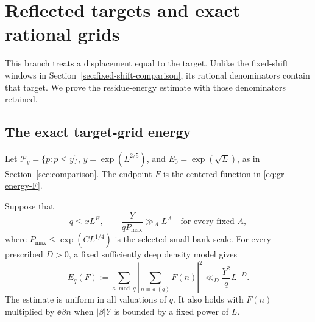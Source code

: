 \section{Reflected targets and exact rational grids}\label{sec:reflected-comparison}

This branch treats a displacement equal to the target. Unlike the
fixed-shift windows in Section~\ref{sec:fixed-shift-comparison}, its
rational denominators contain that target. We prove the residue-energy
estimate with those denominators retained.

\subsection{The exact target-grid energy}


Let \(\mathcal P_y=\{p:p\le y\}\), \(y=\exp(L^{2/5})\), and
\(E_0=\exp(\sqrt L)\), as in Section~\ref{sec:comparison}.
The endpoint \(F\) is the centered function in \eqref{eq:gr-energy-F}.

\begin{proposition}\label{prop:gr-energy}
Suppose that
\begin{equation}
       q\le xL^B,\qquad
       \frac{Y}{qP_{\max}}\gg_A L^A
                       \quad\text{for every fixed }A,
 \label{eq:gr-energy-ratio}
\end{equation}
where \(P_{\max}\le\exp(CL^{1/4})\) is the selected small-bank scale.
For every prescribed \(D>0\), a fixed sufficiently deep density model
gives
\begin{equation}
 E_q(F):=\sum_{a\bmod q}\left|
           \sum_{n\equiv a\ (q)}F(n)\right|^2
                      \ll_D\frac{Y^2}{q}L^{-D}.       \label{eq:gr-energy}
\end{equation}
The estimate is uniform in all valuations of \(q\).
It also holds with \(F(n)\) multiplied by \(\ee{\beta n}\)
when \(|\beta|Y\) is bounded by a fixed power of \(L\).
\end{proposition}

